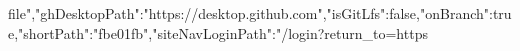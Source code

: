file","ghDesktopPath":"https://desktop.github.com","isGitLfs":false,"onBranch":true,"shortPath":"fbe01fb","siteNavLoginPath":"/login?return_to=https%